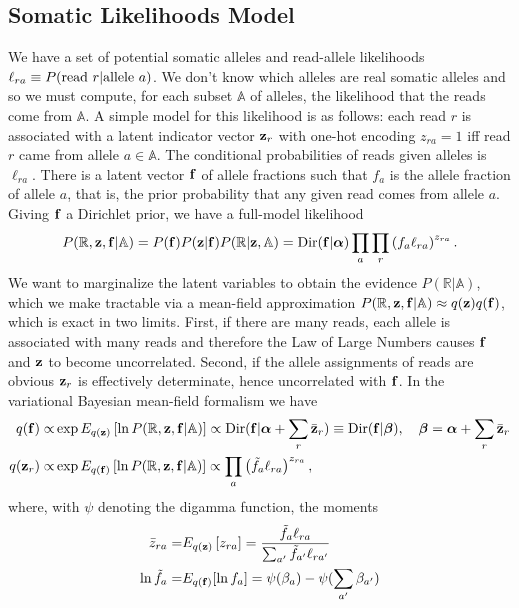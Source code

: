\documentclass[nofootinbib,amssymb,amsmath]{revtex4}
\newcommand{\vf}{{\bf f}}
\newcommand{\vz}{{\bf z}}
\newcommand{\valpha}{{\bm{\alpha}}}
\newcommand{\vbeta}{{\bm{\beta}}}
\begin{document}
\subsection{Somatic Likelihoods Model}\label{introduction}
We have a set of potential somatic alleles and read-allele likelihoods $\ell_{ra} \equiv P({\rm read~}r|{\rm allele~}a)$.  We don't know which alleles are real somatic alleles and so we must compute, for each subset $\mathbb{A}$ of alleles, the likelihood that the reads come from $\mathbb{A}$.  A simple model for this likelihood is as follows: each read $r$ is associated with a latent indicator vector $\vz_r$ with one-hot encoding $z_{ra} = 1$ iff read $r$ came from allele $a \in \mathbb{A}$.  The conditional probabilities of reads given alleles is $\ell_{ra}$.
There is a latent vector $\vf$ of allele fractions such that $f_a$ is the allele fraction of allele $a$, that is, the prior probability that any given read comes from allele $a$.  Giving $\vf$ a Dirichlet prior, we have a full-model likelihood
\begin{equation}
P(\mathbb{R}, \vz, \vf | \mathbb{A}) = P(\vf) P(\vz | \vf)  P( \mathbb{R} | \vz, \mathbb{A}) = {\rm Dir}(\vf | \valpha) \prod_a  \prod_r \left( f_a \ell_{ra}\right)^{z_{ra}}.
\label{full_likelihood}
\end{equation}
We want to marginalize the latent variables to obtain the evidence $P(\mathbb{R} | \mathbb{A})$, which we make tractable via a mean-field approximation $P(\mathbb{R}, \vz, \vf | \mathbb{A}) \approx q(\vz) q(\vf)$, which is exact in two limits.  First, if there are many reads, each allele is associated with many reads and therefore the Law of Large Numbers causes $\vf$ and $\vz$ to become uncorrelated.  Second, if the allele assignments of reads are obvious $\vz_r$ is effectively determinate, hence uncorrelated with $\vf$.  In the variational Bayesian mean-field formalism we have
\begin{align}
q(\vf) \propto& \exp E_{q(\vz)} \left[ \ln P(\mathbb{R}, \vz, \vf | \mathbb{A}) \right] \propto {\rm Dir}(\vf | \valpha + \sum_r \bar{\vz}_r) \equiv {\rm Dir}(\vf | \vbeta), \quad \vbeta = \valpha + \sum_r \bar{\vz}_r \label{z_mean_field}  \\
q(\vz_r) \propto& \exp E_{q(\vf)} \left[ \ln P(\mathbb{R}, \vz, \vf | \mathbb{A}) \right]  \propto \prod_a \left( \tilde{f}_a \ell_{ra}\right)^{z_{ra}}, \label{f_mean_field}
\end{align}
where, with $\psi$ denoting the digamma function, the moments
\begin{align}
\bar{z}_{ra} =& E_{q(\vz)} \left[ z_{ra} \right] = \frac{\tilde{f}_a \ell_{ra}}{\sum_{a^\prime} \tilde{f}_{a^\prime} \ell_{ra^\prime}} \\
\ln \tilde{f}_a =& E_{q(\vf)}[\ln f_a] = \psi(\beta_a) - \psi(\sum_{a^\prime} \beta_{a^\prime})
\end{align}
\end{document}
